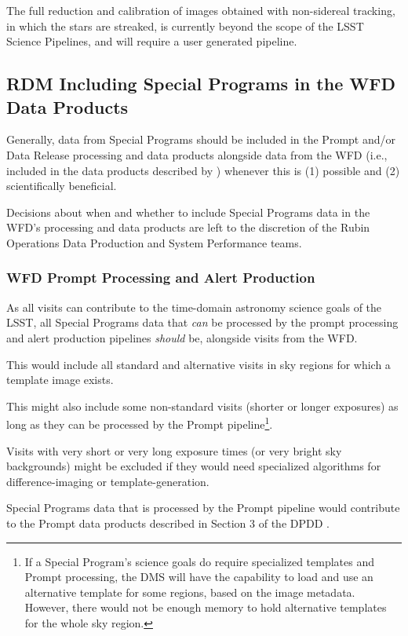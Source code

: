 The full reduction and calibration of images obtained with non-sidereal 
tracking, in which the stars are streaked, is currently beyond the scope 
of the LSST Science Pipelines, and will require a user generated pipeline.


\subsection{RDM Including Special Programs in the WFD Data Products}\label{ssec:proc_wfd}

Generally, data from Special Programs should be included in the Prompt 
and/or Data Release processing and data products alongside data from the 
WFD (i.e., included in the data products described by ) 
whenever this is (1) possible and (2) scientifically beneficial.

Decisions about when and whether to include Special Programs data in 
the WFD's processing and data products are left to the discretion of the 
Rubin Operations Data Production and System Performance teams.


\subsubsection{WFD Prompt Processing and Alert Production}

As all visits can contribute to the time-domain astronomy science goals 
of the LSST, all Special Programs data that {\it can} be processed by the 
prompt processing and alert production pipelines {\it should} be, 
alongside visits from the WFD.

This would include all standard and alternative visits in sky regions for which a template image exists.

This might also include some non-standard visits (shorter or longer exposures) as long as they can be processed by the Prompt 
pipeline\footnote{If a Special Program's science goals do require 
specialized templates and 
Prompt processing, the DMS will have the capability to load and use an 
alternative template for some regions, based on the image metadata. 
However, there would not be enough memory to hold alternative templates 
for the whole sky region.}.

Visits with very short or very long exposure times (or very bright sky 
backgrounds) might be excluded if they would 
need specialized algorithms for difference-imaging or template-generation.

Special Programs data that is processed by the Prompt pipeline would 
contribute to the Prompt data products described in Section 3 of the 
DPDD . 

